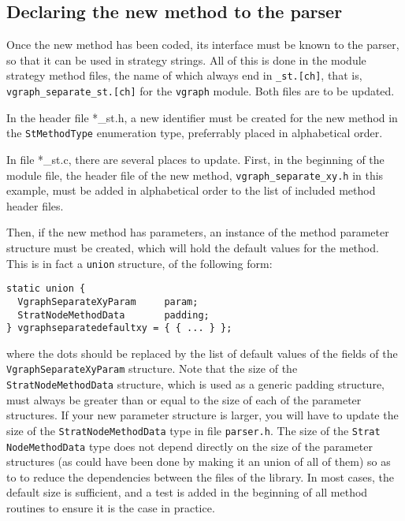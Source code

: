 \subsection{Declaring the new method to the parser}

Once the new method has been coded, its interface must be known to the
parser, so that it can be used in strategy strings. All of this is
done in the module strategy method files, the name of which always end
in \texttt{\_st.[ch]}, that is, \texttt{vgraph\_\lbt separate\_\lbt st.[ch]}
for the \texttt{vgraph} module. Both files are to be updated.

In the header file {*\_st.h}, a new identifier must be created for the
new method in the \texttt{St\lbt Method\lbt Type} enumeration type,
preferrably placed in alphabetical order.

In file {*\_st.c}, there are several places to update.
First, in the beginning of the module file, the header file of the new
method, \texttt{vgraph\_\lbt separate\_\lbt xy.h} in this example,
must be added in alphabetical order to the list of included method
header files.

Then, if the new method has parameters, an instance of the method
parameter structure must be created, which will hold the default
values for the method. This is in fact a \texttt{union} structure,
of the following form:
{\tt\begin{verbatim}
static union {
  VgraphSeparateXyParam     param;
  StratNodeMethodData       padding;
} vgraphseparatedefaultxy = { { ... } };
\end{verbatim}}
where the dots should be replaced by the list of default values of the
fields of the \texttt{Vgraph\lbt Separate\lbt Xy\lbt Param} structure.
Note that the size of the \texttt{Strat\lbt Node\lbt Method\lbt Data}
structure, which is used as a generic padding structure, must always
be greater than or equal to the size of each of the parameter
structures. If your new parameter structure is larger, you will have
to update the size of the \texttt{Strat\lbt Node\lbt Method\lbt Data}
type in file \texttt{parser.h}\enspace. The size of the \texttt{Strat\lbt
Node\lbt Method\lbt Data} type does not depend directly on the size of
the parameter structures (as could have been done by making it an union
of all of them) so as to to reduce the dependencies between the files
of the library. In most cases, the default size is sufficient, and a
test is added in the beginning of all method routines to ensure it is
the case in practice.

